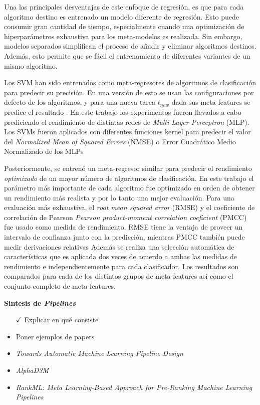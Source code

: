Una las principales desventajas de este enfoque de regresión, es que para cada algoritmo destino es entrenado un modelo diferente de regresión. Esto puede consumir gran cantidad de tiempo, especialmente cuando una optimización de hiperparámetros exhaustiva para los meta-modelos es realizada. Sin embargo, modelos separados simplifican el proceso de añadir y eliminar algoritmos destinos. Además, esto permite que se fácil el entrenamiento de diferentes variantes de un mismo algoritmo. 

Los SVM han sido entrenados como meta-regresores de algoritmos de clasificación para predecir su precisión. En una versión de esto se usan las configuraciones por defecto de los algoritmos, y para una nueva tarea $t_{new}$ dada sus meta-features se predice el resultado \cite{guerra2008predicting}. En este trabajo los experimentos fueron llevados a cabo prediciendo el rendimiento de distintas redes de \textit{Multi-Layer Perceptron} (MLP). Los SVMs fueron aplicados con diferentes funciones kernel para predecir el valor del \textit{Normalized Mean of Squared Errors} (NMSE) o Error Cuadrático Medio Normalizado de los MLPs

Posteriormente, se entrenó un meta-regresor similar \cite{reif2012automatic} para predecir el rendimiento \textit{optimizado} de un mayor número de algoritmos de clasificación. En este trabajo el parámetro más importante de cada algoritmo fue optimizado en orden de obtener un rendimiento más realista y por lo tanto una mejor evaluación. Para una evaluación más exhaustiva, el \textit{root mean squared error} (RMSE) y el coeficiente de correlación de Pearson \textit{Pearson product-moment correlation coeficient} (PMCC) fue usado como medida de rendimiento. RMSE tiene la ventaja de proveer un intervalo de confianza junto con la predicción, mientras PMCC también puede medir derivaciones relativas Además se realiza una selección automática de características que es aplicada dos veces de acuerdo a ambas las medidas de rendimiento e independientemente para cada clasificador. Los resultados son comparados para cada de los distintos grupos de meta-features así como el conjunto completo de meta-features.

\quad

\textbf{Sintesis de \textit{Pipelines}}

\begin{itemize}
	\item[$\checkmark$] Explicar en qué consiste
	\item Poner ejemplos de papers
	\item \textit{Towards Automatic Machine Learning Pipeline Design}
	\item \textit{AlphaD3M}
	\item \textit{RankML: Meta Learning-Based Approach for Pre-Ranking Machine Learning Pipelines}
\end{itemize}

